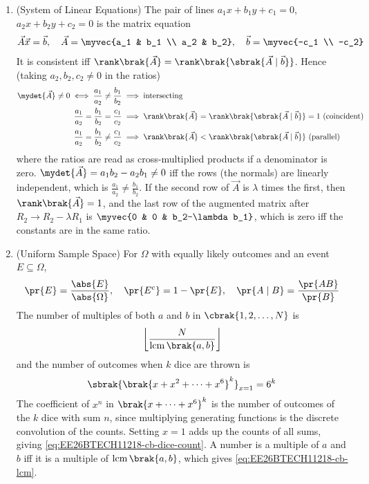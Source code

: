\begin{enumerate}[label=\thesubsection.\arabic*, ref=\thesubsection.\theenumi,itemsep=1.5em]
\item (System of Linear Equations) The pair of lines $a_1x+b_1y+c_1=0$, $a_2x+b_2y+c_2=0$ is the matrix equation
\begin{align}
\vec{A}\vec{x} = \vec{b}, \quad \vec{A} = \myvec{a_1 & b_1 \\ a_2 & b_2}, \quad \vec{b} = \myvec{-c_1 \\ -c_2}
\label{eq:EE26BTECH11218-cb-linsys}
\end{align}
It is consistent iff $\rank\brak{\vec{A}} = \rank\brak{\sbrak{\vec{A}\mid\vec{b}}}$. Hence (taking $a_2,b_2,c_2\ne0$ in the ratios)
\begin{align}
\mydet{\vec{A}} \ne 0 \iff \frac{a_1}{a_2} \ne \frac{b_1}{b_2} &\implies \text{intersecting} \\
\frac{a_1}{a_2} = \frac{b_1}{b_2} = \frac{c_1}{c_2} &\implies \rank\brak{\vec{A}} = \rank\brak{\sbrak{\vec{A}\mid\vec{b}}} = 1\ \text{(coincident)} \\
\frac{a_1}{a_2} = \frac{b_1}{b_2} \ne \frac{c_1}{c_2} &\implies \rank\brak{\vec{A}} < \rank\brak{\sbrak{\vec{A}\mid\vec{b}}} \text{ (parallel)}
\label{eq:EE26BTECH11218-cb-rank-cases}
\end{align}
where the ratios are read as cross-multiplied products if a denominator is zero.
\solution $\mydet{\vec{A}} = a_1b_2 - a_2b_1 \ne 0$ iff the rows (the normals) are linearly independent, which is $\frac{a_1}{a_2}\ne\frac{b_1}{b_2}$. If the second row of $\vec{A}$ is $\lambda$ times the first, then $\rank\brak{\vec{A}}=1$, and the last row of the augmented matrix after $R_2 \to R_2-\lambda R_1$ is $\myvec{0 & 0 & b_2-\lambda b_1}$, which is zero iff the constants are in the same ratio.

\item (Uniform Sample Space) For $\Omega$ with equally likely outcomes and an event $E\subseteq\Omega$,
\begin{align}
\pr{E} = \frac{\abs{E}}{\abs{\Omega}}, \quad \pr{E^{c}} = 1-\pr{E}, \quad
\pr{A\mid B} = \frac{\pr{AB}}{\pr{B}}
\label{eq:EE26BTECH11218-cb-prob}
\end{align}
The number of multiples of both $a$ and $b$ in $\cbrak{1,2,\dots,N}$ is
\begin{align}
\left\lfloor\frac{N}{\operatorname{lcm}\brak{a,b}}\right\rfloor
\label{eq:EE26BTECH11218-cb-lcm}
\end{align}
and the number of outcomes when $k$ dice are thrown is
\begin{align}
\sbrak{\brak{x+x^2+\cdots+x^6}^k}_{x=1} = 6^k
\label{eq:EE26BTECH11218-cb-dice-count}
\end{align}
\solution The coefficient of $x^n$ in $\brak{x+\cdots+x^6}^k$ is the number of outcomes of the $k$ dice with sum $n$, since multiplying generating functions is the discrete convolution of the counts. Setting $x=1$ adds up the counts of all sums, giving \eqref{eq:EE26BTECH11218-cb-dice-count}. A number is a multiple of $a$ and $b$ iff it is a multiple of $\operatorname{lcm}\brak{a,b}$, which gives \eqref{eq:EE26BTECH11218-cb-lcm}.


\end{enumerate}
